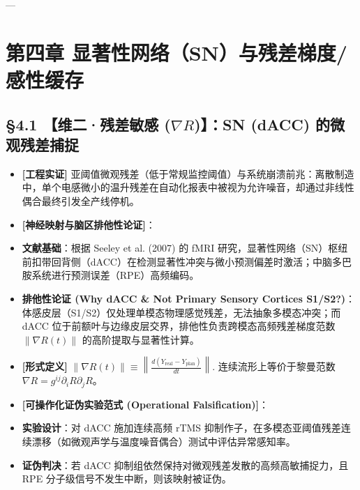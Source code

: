 \documentclass[11pt,a4paper,oneside]{ctexart}
\begin{document}
---


\section{第四章 显著性网络（SN）与残差梯度/感性缓存}

\subsection{§4.1 【维二·残差敏感 ($\nabla R$)】：SN (dACC) 的微观残差捕捉}

\begin{itemize}\item \textbf{[工程实证]} 亚阈值微观残差（低于常规监控阈值）与系统崩溃前兆：离散制造中，单个电感微小的温升残差在自动化报表中被视为允许噪音，却通过非线性偶合最终引发全产线停机。\end{itemize}
\begin{itemize}\item \textbf{[神经映射与脑区排他性论证]}：\end{itemize}
\begin{itemize}\item \textbf{文献基础}：根据 Seeley et al. (2007) 的 fMRI 研究，显著性网络（SN）枢纽前扣带回背侧（dACC）在检测显著性冲突与微小预测偏差时激活；中脑多巴胺系统进行预测误差（RPE）高频编码。\end{itemize}
\begin{itemize}\item \textbf{排他性论证 (Why dACC \& Not Primary Sensory Cortices S1/S2?)}：体感皮层（S1/S2）仅处理单模态物理感觉残差，无法抽象多模态冲突；而 dACC 位于前额叶与边缘皮层交界，排他性负责\textit{}跨模态高频残差梯度范数 $\|\nabla R(t)\|$ 的高阶提取与显著性计算\textit{}。\end{itemize}
\begin{itemize}\item \textbf{[形式定义]} $\|\nabla R(t)\| \equiv \left\| \frac{d (Y_{\text{real}} - Y_{\text{plan}})}{dt} \right\|.$ 连续流形上等价于黎曼范数 $\nabla R = g^{ij} \partial_i R \partial_j R$。\end{itemize}
\begin{itemize}\item \textbf{[可操作化证伪实验范式 (Operational Falsification)]}：\end{itemize}
\begin{itemize}\item \textbf{实验设计}：对 dACC 施加连续高频 rTMS 抑制作子，在多模态亚阈值残差连续漂移（如微观声学与温度噪音偶合）测试中评估异常感知率。\end{itemize}
\begin{itemize}\item \textbf{证伪判决}：若 dACC 抑制组依然保持对微观残差发散的高频高敏捕捉力，且 RPE 分子级信号不发生中断，则该映射被证伪。\end{itemize}
\end{document}
